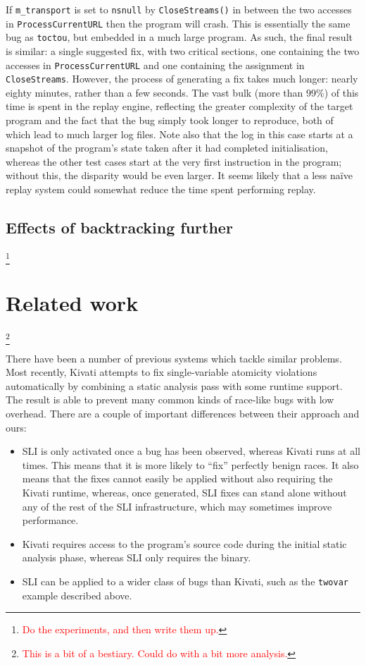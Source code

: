 \documentclass[10pt,twocolumn,preprint,natbib,authoryear]{sigplanconf}
\newcommand{\editorial}[1]{\textcolor{red}{\footnote{\textcolor{red}{#1}}}}
\begin{document}
If \verb|m_transport| is set to \verb|nsnull| by \verb|CloseStreams()|
in between the two accesses in \verb|ProcessCurrentURL| then the
program will crash.  This is essentially the same bug as
\verb|toctou|, but embedded in a much large program.  As such, the
final result is similar: a single suggested fix, with two critical
sections, one containing the two accesses in \verb|ProcessCurrentURL|
and one containing the assignment in \verb|CloseStreams|.  However,
the process of generating a fix takes much longer: nearly eighty
minutes, rather than a few seconds.  The vast bulk (more than 99\%) of
this time is spent in the replay engine, reflecting the greater
complexity of the target program and the fact that the bug simply took
longer to reproduce, both of which lead to much larger log files.
Note also that the log in this case starts at a snapshot of the
program's state taken after it had completed initialisation, whereas
the other test cases start at the very first instruction in the
program; without this, the disparity would be even larger.  It seems
likely that a less na\"ive replay system could somewhat reduce the
time spent performing replay.

\subsection{Effects of backtracking further}
\label{sect:eval:backtrack}

\editorial{Do the experiments, and then write them up.}

\section{Related work}\editorial{This is a bit of a bestiary.  Could do with a bit more analysis.}

There have been a number of previous systems which tackle similar
problems.  Most recently, Kivati\cite{Chew2010a} attempts to fix
single-variable atomicity violations automatically by combining a
static analysis pass with some runtime support.  The result is able to
prevent many common kinds of race-like bugs with low overhead.  There
are a couple of important differences between their approach and ours:

\begin{itemize}
\item SLI is only activated once a bug has been observed, whereas
  Kivati runs at all times.  This means that it is more likely to
  ``fix'' perfectly benign races.  It also means that the fixes cannot
  easily be applied without also requiring the Kivati runtime,
  whereas, once generated, SLI fixes can stand alone without any of
  the rest of the SLI infrastructure, which may sometimes improve
  performance.

\item Kivati requires access to the program's source code during the
  initial static analysis phase, whereas SLI only requires the binary.

\item SLI can be applied to a wider class of bugs than Kivati, such as
  the \verb|twovar| example described above.
\end{itemize}
\end{document}
